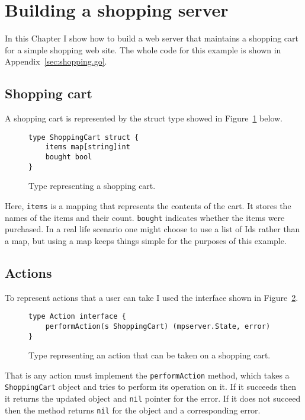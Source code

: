 \section{Building a shopping server}
\label{sec:shopping}
In this Chapter I show how to build a web server that
maintains a shopping cart for a simple shopping web site. The whole 
code for this example is shown in Appendix~\ref{sec:shopping.go}.

\subsection{Shopping cart}
A shopping cart is represented by the struct type showed in 
Figure~\ref{fig:shoppingCart} below.
\begin{figure}[h]
\begin{lstlisting}
type ShoppingCart struct {
    items map[string]int
    bought bool
}
\end{lstlisting}
\caption[scale=1.0]{Type representing a shopping cart.}
\label{fig:shoppingCart}
\end{figure}

Here, \texttt{items} is 
a mapping that represents the contents of the cart. It stores the names
of the items and their count. \texttt{bought} indicates whether the items
were purchased. In a real life scenario one might choose to use 
a list of Ids rather than a map, but using a map keeps things simple
for the purposes of this example.

\subsection{Actions}
To represent actions that a user can take I used the interface shown in 
Figure~\ref{fig:action}.
\begin{figure}[h]
\begin{lstlisting}
type Action interface {
    performAction(s ShoppingCart) (mpserver.State, error)
}
\end{lstlisting}
\caption[scale=1.0]{Type representing an action that can be taken on 
a shopping cart.}
\label{fig:action}
\end{figure}

That is any action must implement the \texttt{performAction} method, which takes
a \texttt{ShoppingCart} object and tries to perform its operation on it. If
it succeeds then it returns the updated object and \texttt{nil} pointer for the
error. If it does not succeed then the method returns \texttt{nil} for the
object and a corresponding error.

